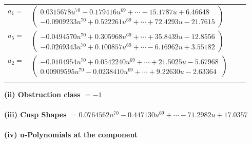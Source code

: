 \documentclass[1p]{elsarticle_modified}
\theoremstyle{definition}
\begin{document}
\begin{tabular}{m{7pt} m{180pt} m{7pt} m{180pt} }
\flushright $a_{1}=$&$\begin{pmatrix}0.0315678 u^{70}-0.179416 u^{69}+\cdots-15.1787 u+6.46648\\-0.0909233 u^{70}+0.522261 u^{69}+\cdots+72.4293 u-21.7615\end{pmatrix}$ \\
\flushright $a_{5}=$&$\begin{pmatrix}-0.0494570 u^{70}+0.305968 u^{69}+\cdots+35.8439 u-12.8556\\-0.0269343 u^{70}+0.100857 u^{69}+\cdots-6.16962 u+3.55182\end{pmatrix}$ \\
\flushright $a_{2}=$&$\begin{pmatrix}-0.0104954 u^{70}+0.0542240 u^{69}+\cdots+21.5025 u-5.67968\\0.00909595 u^{70}-0.0238410 u^{69}+\cdots+9.22630 u-2.63364\end{pmatrix}$\\&\end{tabular}
\flushleft \textbf{(ii) Obstruction class $= -1$}\\~\\
\flushleft \textbf{(iii) Cusp Shapes $= 0.0764562 u^{70}-0.447130 u^{69}+\cdots-71.2982 u+17.0357$}\\~\\
\newpage\renewcommand{\arraystretch}{1}
\flushleft \textbf{(iv) u-Polynomials at the component}\newline \\
\end{document}
